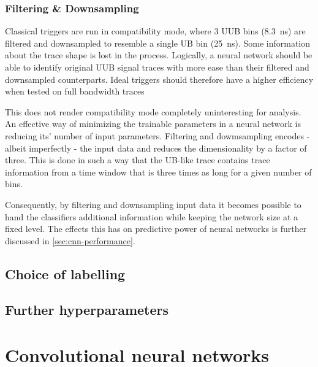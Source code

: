 \subsubsection{Filtering \& Downsampling}
\label{sssec:filtering-and-downsampling}

Classical triggers are run in compatibility mode, where 3 UUB bins (\SI{8.3}{\nano\second}) are filtered and downsampled to resemble a single UB bin 
(\SI{25}{\nano\second}). Some information about the trace shape is lost in the process. Logically, a neural network should be able to identify original UUB signal 
traces with more ease than their filtered and downsampled counterparts. Ideal triggers should therefore have a higher efficiency when tested on full bandwidth 
traces

This does not render compatibility mode completely uninteresting for analysis. An effective way of minimizing the trainable parameters in a neural network is 
reducing its' number of input parameters. Filtering and dowmsampling encodes - albeit imperfectly - the input data and reduces the dimensionality by a factor of 
three. This is done in such a way that the UB-like trace contains trace information from a time window that is three times as long for a given number of bins.

Consequently, by filtering and downsampling input data it becomes possible to hand the classifiers additional information while keeping the network size at a fixed
level. The effects this has on predictive power of neural networks is further discussed in \autoref{sec:cnn-performance}. 

\subsection{Choice of labelling}
\label{ssec:choice-of-labelling}


\subsection{Further hyperparameters}
\label{ssec:further-hyperparameters}


\section{Convolutional neural networks}
\label{sec:cnn-performance}

